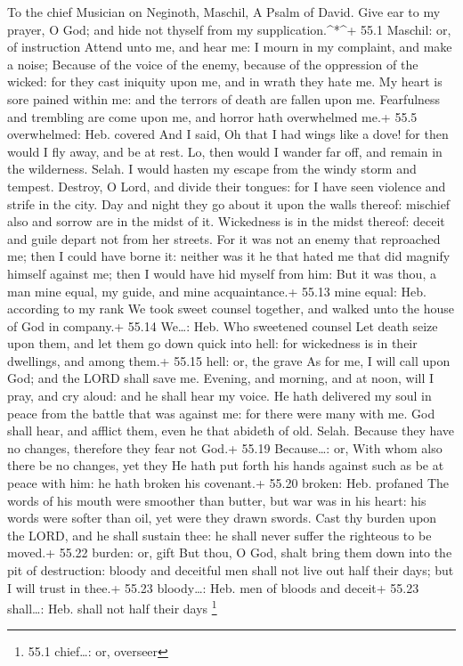 To the chief Musician on Neginoth, Maschil, A Psalm of David.
 Give ear to my prayer, O God; and hide not thyself from my
supplication.\^{}*\^{}+ 55.1 Maschil: or, of instruction 
Attend unto me, and hear me: I mourn in my complaint, and make a noise;
 Because of the voice of the enemy, because of the
oppression of the wicked: for they cast iniquity upon me, and in wrath
they hate me.  My heart is sore pained within me: and the
terrors of death are fallen upon me.  Fearfulness and
trembling are come upon me, and horror hath overwhelmed me.+ 55.5
overwhelmed: Heb. covered  And I said, Oh that I had wings
like a dove! for then would I fly away, and be at rest.  Lo,
then would I wander far off, and remain in the wilderness. Selah.
 I would hasten my escape from the windy storm and tempest.
 Destroy, O Lord, and divide their tongues: for I have seen
violence and strife in the city.  Day and night they go
about it upon the walls thereof: mischief also and sorrow are in the
midst of it.  Wickedness is in the midst thereof: deceit
and guile depart not from her streets.  For it was not an
enemy that reproached me; then I could have borne it: neither was it he
that hated me that did magnify himself against me; then I would have hid
myself from him:  But it was thou, a man mine equal, my
guide, and mine acquaintance.+ 55.13 mine equal: Heb. according to my
rank  We took sweet counsel together, and walked unto the
house of God in company.+ 55.14 We\ldots: Heb. Who sweetened counsel
 Let death seize upon them, and let them go down quick into
hell: for wickedness is in their dwellings, and among them.+ 55.15 hell:
or, the grave  As for me, I will call upon God; and the
LORD shall save me.  Evening, and morning, and at noon,
will I pray, and cry aloud: and he shall hear my voice.  He
hath delivered my soul in peace from the battle that was against me: for
there were many with me.  God shall hear, and afflict them,
even he that abideth of old. Selah. Because they have no changes,
therefore they fear not God.+ 55.19 Because\ldots: or, With whom also
there be no changes, yet they  He hath put forth his hands
against such as be at peace with him: he hath broken his covenant.+
55.20 broken: Heb. profaned  The words of his mouth were
smoother than butter, but war was in his heart: his words were softer
than oil, yet were they drawn swords.  Cast thy burden upon
the LORD, and he shall sustain thee: he shall never suffer the righteous
to be moved.+ 55.22 burden: or, gift  But thou, O God,
shalt bring them down into the pit of destruction: bloody and deceitful
men shall not live out half their days; but I will trust in thee.+ 55.23
bloody\ldots: Heb. men of bloods and deceit+ 55.23 shall\ldots: Heb.
shall not half their days \footnote{55.1 chief\ldots: or, overseer}

